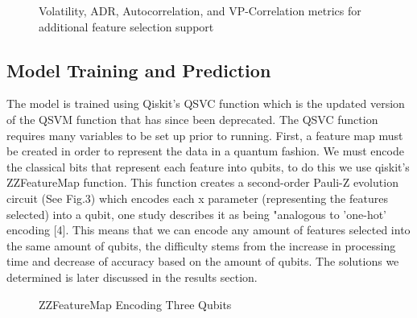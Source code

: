 \documentclass{article}
\begin{document}
\begin{figure}[H]
    \centering
    \caption{Volatility, ADR, Autocorrelation, and VP-Correlation metrics for additional feature selection support}
    \label{fig:2}
\end{figure}
\subsection*{Model Training and Prediction}
The model is trained using Qiskit's QSVC function which is the updated version of the QSVM function that has since been deprecated. The QSVC function requires many variables to be set up prior to running. First, a feature map must be created in order to represent the data in a quantum fashion. We must encode the classical bits that represent each feature into qubits, to do this we use qiskit's ZZFeatureMap function. This function creates a second-order Pauli-Z evolution circuit (See Fig.3) which encodes each x parameter (representing the features selected) into a qubit, one study describes it as being "analogous to 'one-hot' encoding [4]. This means that we can encode any amount of features selected into the same amount of qubits, the difficulty stems from the increase in processing time and decrease of accuracy based on the amount of qubits. The solutions we determined is later discussed in the results section. 
\begin{figure}[H]
    \centering
    \caption{ZZFeatureMap Encoding Three Qubits}
    \label{fig:3}
\end{figure}
\end{document}
